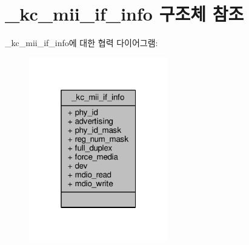 \hypertarget{struct__kc__mii__if__info}{}\section{\+\_\+kc\+\_\+mii\+\_\+if\+\_\+info 구조체 참조}
\label{struct__kc__mii__if__info}


\+\_\+kc\+\_\+mii\+\_\+if\+\_\+info에 대한 협력 다이어그램\+:
\nopagebreak
\begin{figure}[H]
\begin{center}
\leavevmode
\includegraphics[width=172pt]{struct__kc__mii__if__info__coll__graph}
\end{center}
\end{figure}

